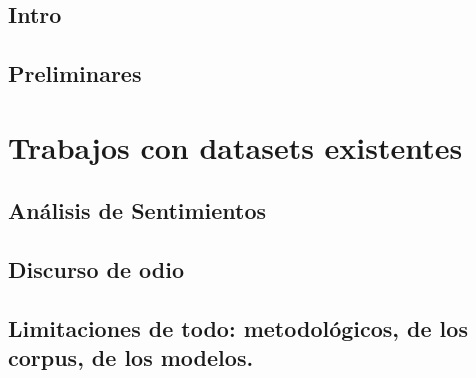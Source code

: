\documentclass[11pt,a4paper,twoside]{tesis}
\begin{document}

\def\autor{Juan Manuel Pérez}
\def\tituloTesis{Título de tesis: \vspace{.2cm} \\ Sarasa y alcances}
\def\runtitulo{Título de tesis: \vspace{.2cm} \\ Técnicas y alcances}
\def\runtitle{Star Wars: Rebellion and Empire}
\def\director{Franco Luque}
\def\codirector{Agustín Gravano}
\def\lugar{Buenos Aires, 2021}


\frontmatter
\pagestyle{empty}


\cleardoublepage

\cleardoublepage

\cleardoublepage

\cleardoublepage
\tableofcontents

\mainmatter
\pagestyle{headings}



\chapter{Intro}
\chapter{Preliminares}

\part{Trabajos con datasets existentes}

\chapter{Análisis de Sentimientos}


\chapter{Discurso de odio}

\chapter{Limitaciones de todo: metodológicos, de los corpus, de los modelos.}

\end{document}
